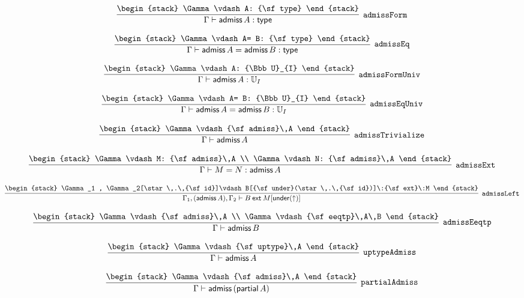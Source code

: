 \[
\infer[{\tt admissForm}]{\Gamma \vdash {\sf admiss}\,A: {\sf type}}{
\begin{stack}
\Gamma \vdash A: {\sf type}
\end{stack}}
\]

\[
\infer[{\tt admissEq}]{\Gamma \vdash {\sf admiss}\,A= {\sf admiss}\,B: {\sf type}}{
\begin{stack}
\Gamma \vdash A= B: {\sf type}
\end{stack}}
\]

\[
\infer[{\tt admissFormUniv}]{\Gamma \vdash {\sf admiss}\,A: {\Bbb U}_{I}}{
\begin{stack}
\Gamma \vdash A: {\Bbb U}_{I}
\end{stack}}
\]

\[
\infer[{\tt admissEqUniv}]{\Gamma \vdash {\sf admiss}\,A= {\sf admiss}\,B: {\Bbb U}_{I}}{
\begin{stack}
\Gamma \vdash A= B: {\Bbb U}_{I}
\end{stack}}
\]

\[
\infer[{\tt admissTrivialize}]{\Gamma \vdash {\sf admiss}\,A}{
\begin{stack}
\Gamma \vdash {\sf admiss}\,A
\end{stack}}
\]

\[
\infer[{\tt admissExt}]{\Gamma \vdash M= N: {\sf admiss}\,A}{
\begin{stack}
\Gamma \vdash M: {\sf admiss}\,A
\\
\Gamma \vdash N: {\sf admiss}\,A
\end{stack}}
\]

\[
\infer[{\tt admissLeft}]{\Gamma_1 ,({\sf admiss}\,A), \Gamma_2 \vdash B\:{\sf ext}\:M[{\sf under}(\uparrow )]}{
\begin{stack}
\Gamma_1 , \Gamma_2[\star \,.\,{\sf id}]\vdash B[{\sf under}(\star \,.\,{\sf id})]\:{\sf ext}\:M
\end{stack}}
\]

\[
\infer[{\tt admissEeqtp}]{\Gamma \vdash {\sf admiss}\,B}{
\begin{stack}
\Gamma \vdash {\sf admiss}\,A
\\
\Gamma \vdash {\sf eeqtp}\,A\,B
\end{stack}}
\]

\[
\infer[{\tt uptypeAdmiss}]{\Gamma \vdash {\sf admiss}\,A}{
\begin{stack}
\Gamma \vdash {\sf uptype}\,A
\end{stack}}
\]

\[
\infer[{\tt partialAdmiss}]{\Gamma \vdash {\sf admiss}\,({\sf partial}\,A)}{
\begin{stack}
\Gamma \vdash {\sf admiss}\,A
\end{stack}}
\]

